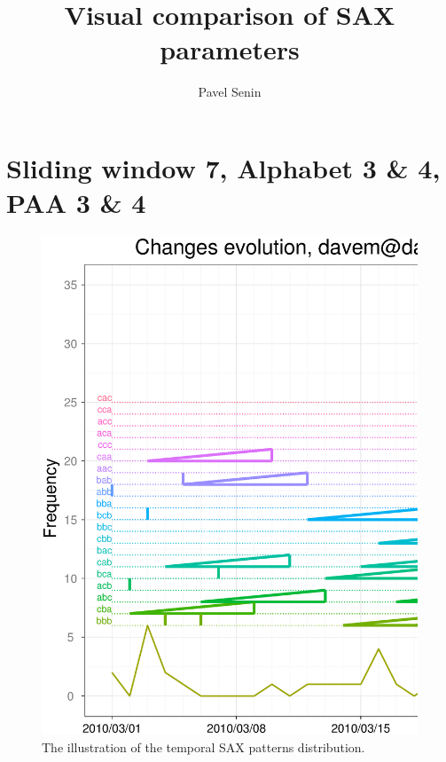 \documentclass[a4paper,10pt]{article}
\title{Visual comparison of SAX parameters}
\author{Pavel Senin}
\numberwithin{equation}{subsection}
\begin{document}
\maketitle

\begin{abstract}

\end{abstract}
\clearpage

\section{Sliding window 7, Alphabet 3 \& 4, PAA 3 \& 4}
\begin{figure}[h]
\noindent\begin{minipage}{\textwidth}
  \centering
  \includegraphics[width=\textwidth]{figures/march_fragment_w7p3a3.ps}
  \caption{The illustration of the temporal SAX patterns distribution.}
  \label{fig:march_patterns2}
\end{minipage}
\end{figure}
\end{document}
